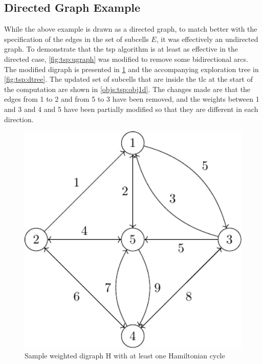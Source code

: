
\subsection{Directed Graph Example}
While the above example is drawn as a directed graph, to match better with the specification of the edges in the set of subcells \(E\), it was effectively an undirected graph.  To demonstrate that the \gls{tsp} algorithm is at least as effective in the directed case, \cref{fig:tsp:ugraph} was modified to remove some bidirectional arcs.  The modified digraph is presented in \cref{fig:tsp:digraph} and the accompanying exploration tree in \cref{fig:tsp:dtree}.  The updated set of subcells that are inside the \gls{tlc} at the start of the computation are shown in \cref{objs:tsp:obj1d}.  The changes made are that the edges from 1 to 2 and from 5 to 3 have been removed, and the weights between 1 and 3 and 4 and 5 have been partially modified so that they are different in each direction.

\begin{figure}
\centering
\includegraphics[keepaspectratio,width=1.0\textwidth,height=0.35\textheight]{chapters/tsp/figs/ugraph-figure2}
\caption{\label{fig:tsp:digraph}Sample weighted digraph H with at least one Hamiltonian cycle}
\end{figure}


